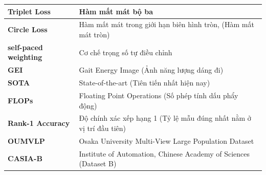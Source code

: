 \begin{table}[h]
\begin{tabular}{|l|p{10cm}|}
        \textbf{Triplet Loss}           & Hàm mất mát bộ ba                                                                                  \\
        \hline
        \textbf{Circle Loss}            & Hàm mất mát trong giới hạn biên hình tròn, (Hàm mất mát tròn)                                      \\
        \hline
        \textbf{self-paced weighting}   & Cơ chế trọng số tự điều chỉnh                                                                      \\
        \hline
        \textbf{GEI}                    & Gait Energy Image (Ảnh năng lượng dáng đi)                                                         \\
        \hline
        \textbf{SOTA}                   & State-of-the-art (Tiên tiến nhất hiện nay)                                                         \\
        \hline
        \textbf{FLOPs}                  & Floating Point Operations (Số phép tính dấu phẩy động)                                             \\
        \hline
        \textbf{Rank-1 Accuracy}        & Độ chính xác xếp hạng 1 (Tỷ lệ mẫu đúng nhất nằm ở vị trí đầu tiên)                                \\
        \hline
        \textbf{OUMVLP}                 & Osaka University Multi-View Large Population Dataset                                               \\
        \hline
        \textbf{CASIA-B}                & Institute of Automation, Chinese Academy of Sciences (Dataset B)                                   \\
        \hline
    \end{tabular}
\end{table}
